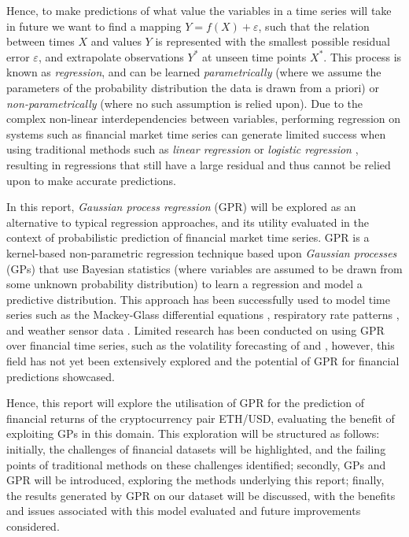 \documentclass[a4paper, 11pt]{article}
\begin{document}
    Hence, to make predictions of what value the variables in a time series will take in future we want to find a mapping $Y = f(X) + \varepsilon$, such that the relation between times $X$ and values $Y$ is represented with the smallest possible residual error $\varepsilon$, and extrapolate observations $Y^*$ at unseen time points $X^*$. This process is known as \emph{regression}, and can be learned \emph{parametrically} (where we assume the parameters of the probability distribution the data is drawn from a priori) or \emph{non-parametrically} (where no such assumption is relied upon). Due to the complex non-linear interdependencies between variables, performing regression on systems such as financial market time series can generate limited success when using traditional methods such as \emph{linear regression} \cite{lin-2007} or \emph{logistic regression} \cite{baidoo-2016}, resulting in regressions that still have a large residual and thus cannot be relied upon to make accurate predictions. 

    In this report, \emph{Gaussian process regression} (GPR) will be explored as an alternative to typical regression approaches, and its utility evaluated in the context of probabilistic prediction of financial market time series. GPR is a kernel-based non-parametric regression technique based upon \emph{Gaussian processes} (GPs) that use Bayesian statistics (where variables are assumed to be drawn from some unknown probability distribution) to learn a regression and model a predictive distribution. This approach has been successfully used to model time series such as the Mackey-Glass differential equations \cite{girard-2002}, respiratory rate patterns \cite{bermak-2004}, and weather sensor data \cite{roberts-2013}. Limited research has been conducted on using GPR over financial time series, such as the volatility forecasting of  and , however, this field has not yet been extensively explored and the potential of GPR for financial predictions showcased. 

    Hence, this report will explore the utilisation of GPR for the prediction of financial returns of the cryptocurrency pair ETH/USD, evaluating the benefit of exploiting GPs in this domain. This exploration will be structured as follows: initially, the challenges of financial datasets will be highlighted, and the failing points of traditional methods on these challenges identified; secondly, GPs and GPR will be introduced, exploring the methods underlying this report; finally, the results generated by GPR on our dataset will be discussed, with the benefits and issues associated with this model evaluated and future improvements considered. 
\end{document}
